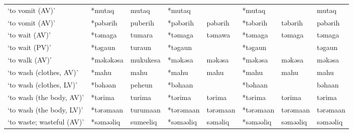 \begin{landscape}
\begin{longtable}[c]{@{}p{3cm}<{\raggedright}p{2.75cm}<{\raggedright}p{2.75cm}<{\raggedright}p{2.75cm}<{\raggedright}p{2.75cm}<{\raggedright}p{2.75cm}<{\raggedright}p{2.75cm}<{\raggedright}p{2.75cm}<{\raggedright}@{}}
`to vomit (AV)'                                      & *mutaq       & mutaq                         & *mutaq         &                            & *mutaq           &                          & mutaq                             \\
`to vomit (AV)'                                      & *pəbərih     & puberih                       & *pəbərih       & pəbərih                    & *təbərih         & təbərih                  & pəbərih                           \\
`to wait (AV)'                                       & *təmaga      & tumara                        & *təmaga        & təmawa                     & *təmaga          & təmaga                   & təmaga                            \\
`to wait (PV)'                                       & *təgaun      & turaun                        & *təgaun        &                            & *təgaun          &                          & təgaun                            \\
`to walk (AV)'                                       & *məkəkəsa    & mukukesa                      & *məkəsa        & məkəsa                     & *məkəsa          & məkəsa                   & məkəsa                            \\
`to wash (clothes, AV)'                              & *mahu        & mahu                          & *mahu          & mahu                       & *mahu            & mahu                     & mahu                              \\
`to wash (clothes, LV)'                              & *bəhəan      & peheun                        & *bəhaan        &                            & *bəhaan          &                          & bəhaan                            \\
`to wash (the body, AV)'                             & *tərima      & turima                        & *tərima        & tərima                     & *tərima          & tərima                   & tərima                            \\
`to wash (the body, LV)'                             & *tərəmaan    & turumaan                      & *tərəmaan      & tərəmaan                   & *tərəmaan        & tərəmaan                 & tərəmaan                          \\
`to waste; wasteful (AV)'                            & *səməəliq    & sumeeliq                      & *səməəliq      & səməliq                    & *səməəliq        & səməəliq                 & səməəliq                          \\

\end{longtable}
\end{landscape}
